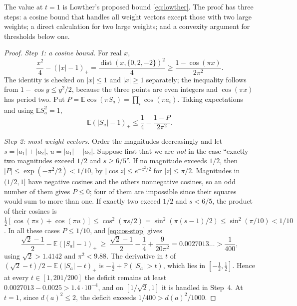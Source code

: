 \documentclass[11pt,a4paper]{article}
\numberwithin{equation}{section}
\theoremstyle{remark}
\newcommand{\E}{\mathbb E}
\newcommand{\PP}{\mathbb P}
\newcommand{\dist}{\operatorname{dist}}
\begin{document}
The value at $t=1$ is Lowther's proposed bound \eqref{eq:lowther}. The proof
has three steps: a cosine bound that handles all weight vectors except those
with two large weights; a direct calculation for two large weights; and a
convexity argument for thresholds below one.

\begin{proof}
\emph{Step 1: a cosine bound.} For real $x$,
\[
 \frac{x^2}{4}-(|x|-1)_+=\frac{\dist(x,\{0,2,-2\})^2}{4}
 \ge\frac{1-\cos(\pi x)}{2\pi^2}.
\]
The identity is checked on $|x|\le1$ and $|x|\ge1$ separately; the
inequality follows from $1-\cos y\le y^2/2$, because the three points are
even integers and $\cos(\pi x)$ has period two. Put
$P=\E\cos(\pi S_a)=\prod_i\cos(\pi a_i)$. Taking expectations and using
$\E S_a^2=1$,
\begin{equation}\label{eq:cos-stop}
 \E(|S_a|-1)_+\le\frac14-\frac{1-P}{2\pi^2}.
\end{equation}

\emph{Step 2: most weight vectors.} Order the magnitudes decreasingly and
let $s=|a_1|+|a_2|$, $u=|a_1|-|a_2|$. Suppose first that we are \emph{not}
in the case ``exactly two magnitudes exceed $1/2$ and $s\ge6/5$''. If no
magnitude exceeds $1/2$, then $|P|\le\exp(-\pi^2/2)<1/10$, by
$|\cos z|\le e^{-z^2/2}$ for $|z|\le\pi/2$. Magnitudes in $(1/2,1]$ have
negative cosines and the others nonnegative cosines, so an odd number of
them gives $P\le0$; four of them are impossible since their squares would
sum to more than one. If exactly two exceed $1/2$ and $s<6/5$, the product
of their cosines is
$\tfrac12[\cos(\pi s)+\cos(\pi u)]\le\cos^2(\pi s/2)=\sin^2(\pi(s-1)/2)
\le\sin^2(\pi/10)<1/10$. In all these cases $P\le1/10$, and
\eqref{eq:cos-stop} gives
\[
 \frac{\sqrt2-1}{2}-\E(|S_a|-1)_+\ \ge\ \frac{\sqrt2-1}{2}-\frac14+\frac{9}{20\pi^2}
 =0.0027013\ldots>\frac1{400},
\]
using $\sqrt2>1.4142$ and $\pi^2<9.88$. The derivative in $t$ of
$(\sqrt2-t)/2-\E(|S_a|-t)_+$ is $-\tfrac12+\PP(|S_a|>t)$, which lies in
$[-\tfrac12,\tfrac12]$. Hence at every $t\in[1,201/200]$ the deficit
remains at least $0.0027013-0.0025>1.4\cdot10^{-4}$, and on
$[1/\sqrt2,1]$ it is handled in Step~4. At $t=1$, since $d(a)^2\le2$, the
deficit exceeds $1/400>d(a)^2/1000$.


\end{proof}
\end{document}
